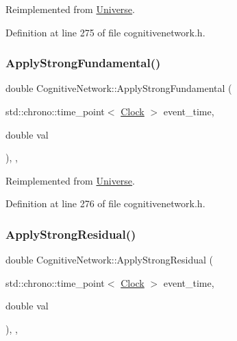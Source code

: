 Reimplemented from \mbox{\hyperlink{class_universe_a906a88b37f10bfa630bef49dfd0e907a}{Universe}}.



Definition at line 275 of file cognitivenetwork.\+h.

\mbox{\label{class_cognitive_network_af25bbd4f4d8f370cd2a48fd6db8302b9}} 
\subsubsection{\texorpdfstring{Apply\+Strong\+Fundamental()}{ApplyStrongFundamental()}}
{\footnotesize\ttfamily double Cognitive\+Network\+::\+Apply\+Strong\+Fundamental (\begin{DoxyParamCaption}\item[{std\+::chrono\+::time\+\_\+point$<$ \mbox{\hyperlink{universe_8h_a0ef8d951d1ca5ab3cfaf7ab4c7a6fd80}{Clock}} $>$}]{event\+\_\+time,  }\item[{double}]{val }\end{DoxyParamCaption})\hspace{0.3cm}{\ttfamily [inline]}, {\ttfamily [final]}, {\ttfamily [virtual]}}



Reimplemented from \mbox{\hyperlink{class_universe_a62789bcff84bd750b0366004381e2fdd}{Universe}}.



Definition at line 276 of file cognitivenetwork.\+h.

\mbox{\label{class_cognitive_network_a8b60fdb81d89a3a74d6c06cb29e7aad3}} 
\subsubsection{\texorpdfstring{Apply\+Strong\+Residual()}{ApplyStrongResidual()}}
{\footnotesize\ttfamily double Cognitive\+Network\+::\+Apply\+Strong\+Residual (\begin{DoxyParamCaption}\item[{std\+::chrono\+::time\+\_\+point$<$ \mbox{\hyperlink{universe_8h_a0ef8d951d1ca5ab3cfaf7ab4c7a6fd80}{Clock}} $>$}]{event\+\_\+time,  }\item[{double}]{val }\end{DoxyParamCaption})\hspace{0.3cm}{\ttfamily [inline]}, {\ttfamily [final]}, {\ttfamily [virtual]}}



